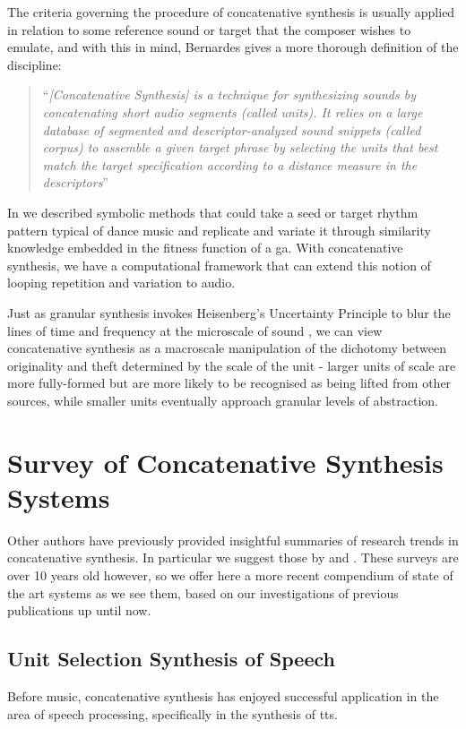 The criteria governing the procedure of concatenative synthesis is usually applied in relation to some reference sound or target that the composer wishes to emulate, and with this in mind, Bernardes gives a more thorough definition of the discipline:

\blockcquote[]{Bernardes2013}{``\textit{[Concatenative Synthesis] is a technique for synthesizing sounds by concatenating short audio segments (called units). It relies on a large database of segmented and descriptor-analyzed sound snippets (called corpus) to assemble a given target phrase by selecting the units that best match the target specification according to a distance measure in the descriptors}''}

In  we described symbolic methods that could take a seed or target rhythm pattern typical of dance music and replicate and variate it through similarity knowledge embedded in the fitness function of a \acrshort{ga}. With concatenative synthesis, we have a computational framework that can extend this notion of looping repetition and variation to audio. 

Just as granular synthesis invokes Heisenberg's Uncertainty Principle to blur the lines of time and frequency at the microscale of sound \citep{Truax2005}, we can view concatenative synthesis as a macroscale manipulation of the dichotomy between originality and theft determined by the scale of the unit - larger units of scale are more fully-formed but are more likely to be recognised as being lifted from other sources, while smaller units eventually approach granular levels of abstraction.
\section{Survey of Concatenative Synthesis Systems}

Other authors have previously provided insightful summaries of research trends in concatenative synthesis. In particular we suggest those by \cite{Schwarz2005, Schwarz2006b} and \cite{Sturm2006}. These surveys are over 10 years old however, so we offer here a more recent compendium of state of the art systems as we see them, based on our investigations of previous publications up until now.

\subsection{Unit Selection Synthesis of Speech}

Before music, concatenative synthesis has enjoyed successful application in the area of speech processing, specifically in the synthesis of \acrfull{tts}.

